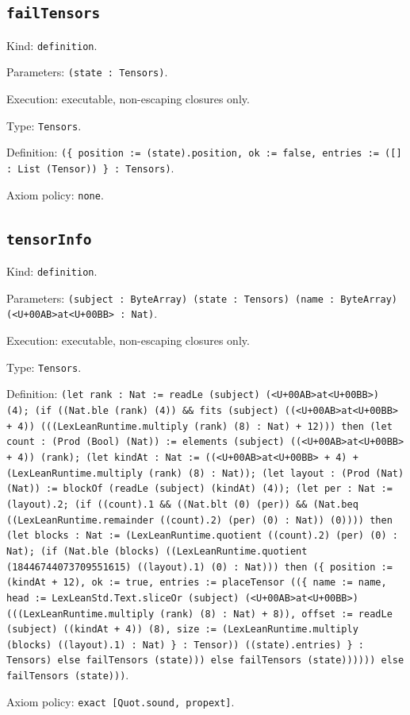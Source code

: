 \documentclass[11pt]{article}
\begin{document}
\subsection*{\texttt{failTensors}}
\noindent Kind: \texttt{definition}.\par
\noindent Parameters: \texttt{(state : Tensors)}.\par
\noindent Execution: executable, non-escaping closures only.\par
\noindent Type: \texttt{Tensors}.\par
\noindent Definition: \texttt{(\{ position := (state).position, ok := false, entries := ([] : List (Tensor)) \} : Tensors)}.\par
\noindent Axiom policy: \texttt{none}.\par
\subsection*{\texttt{tensorInfo}}
\noindent Kind: \texttt{definition}.\par
\noindent Parameters: \texttt{(subject : ByteArray) (state : Tensors) (name : ByteArray) (<U+00AB>at<U+00BB> : Nat)}.\par
\noindent Execution: executable, non-escaping closures only.\par
\noindent Type: \texttt{Tensors}.\par
\noindent Definition: \texttt{(let rank : Nat := readLe (subject) (<U+00AB>at<U+00BB>) (4); (if ((Nat.ble (rank) (4)) \&\& fits (subject) ((<U+00AB>at<U+00BB> + 4)) (((LexLeanRuntime.multiply (rank) (8) : Nat) + 12))) then (let count : (Prod (Bool) (Nat)) := elements (subject) ((<U+00AB>at<U+00BB> + 4)) (rank); (let kindAt : Nat := ((<U+00AB>at<U+00BB> + 4) + (LexLeanRuntime.multiply (rank) (8) : Nat)); (let layout : (Prod (Nat) (Nat)) := blockOf (readLe (subject) (kindAt) (4)); (let per : Nat := (layout).2; (if ((count).1 \&\& ((Nat.blt (0) (per)) \&\& (Nat.beq ((LexLeanRuntime.remainder ((count).2) (per) (0) : Nat)) (0)))) then (let blocks : Nat := (LexLeanRuntime.quotient ((count).2) (per) (0) : Nat); (if (Nat.ble (blocks) ((LexLeanRuntime.quotient (18446744073709551615) ((layout).1) (0) : Nat))) then (\{ position := (kindAt + 12), ok := true, entries := placeTensor ((\{ name := name, head := LexLeanStd.Text.sliceOr (subject) (<U+00AB>at<U+00BB>) (((LexLeanRuntime.multiply (rank) (8) : Nat) + 8)), offset := readLe (subject) ((kindAt + 4)) (8), size := (LexLeanRuntime.multiply (blocks) ((layout).1) : Nat) \} : Tensor)) ((state).entries) \} : Tensors) else failTensors (state))) else failTensors (state)))))) else failTensors (state)))}.\par
\noindent Axiom policy: \texttt{exact [Quot.sound, propext]}.\par
\end{document}
